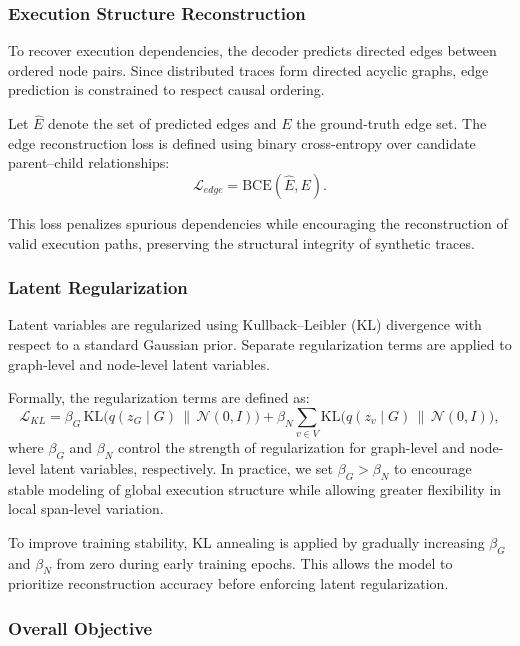 \documentclass[sigconf,review]{acmart}
\begin{document}
\subsubsection{Execution Structure Reconstruction}

To recover execution dependencies, the decoder predicts directed edges between ordered node pairs. Since distributed traces form directed acyclic graphs, edge prediction is constrained to respect causal ordering.

Let $\hat{E}$ denote the set of predicted edges and $E$ the ground-truth edge set. The edge reconstruction loss is defined using binary cross-entropy over candidate parent--child relationships:
\begin{equation}
\mathcal{L}_{edge} =
\mathrm{BCE}(\hat{E}, E).
\end{equation}

This loss penalizes spurious dependencies while encouraging the reconstruction of valid execution paths, preserving the structural integrity of synthetic traces.

\subsubsection{Latent Regularization}

Latent variables are regularized using Kullback--Leibler (KL) divergence with respect to a standard Gaussian prior. Separate regularization terms are applied to graph-level and node-level latent variables.

Formally, the regularization terms are defined as:
\begin{equation}
\mathcal{L}_{KL} =
\beta_G \, \mathrm{KL}\big(q(z_G \mid G) \,\|\, \mathcal{N}(0, I)\big)
+
\beta_N \sum_{v \in V}
\mathrm{KL}\big(q(z_v \mid G) \,\|\, \mathcal{N}(0, I)\big),
\end{equation}
where $\beta_G$ and $\beta_N$ control the strength of regularization for graph-level and node-level latent variables, respectively. In practice, we set $\beta_G > \beta_N$ to encourage stable modeling of global execution structure while allowing greater flexibility in local span-level variation.

To improve training stability, KL annealing is applied by gradually increasing $\beta_G$ and $\beta_N$ from zero during early training epochs. This allows the model to prioritize reconstruction accuracy before enforcing latent regularization.

\subsubsection{Overall Objective}
\end{document}
